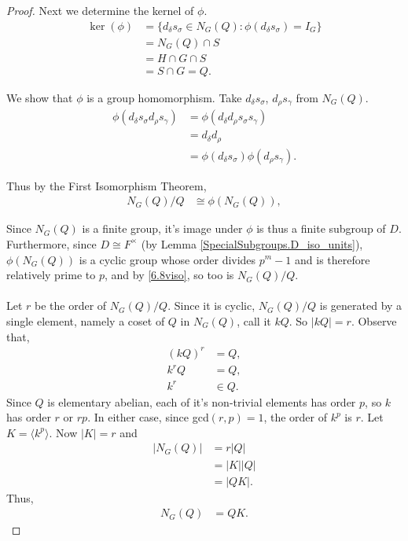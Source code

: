 \begin{footnotesize}
\begin{proof}
Next we determine the kernel of $\phi$.
\begin{align*} \ker(\phi) &= \{ d_\delta s_\sigma \in N_G(Q) : \phi(d_\delta s_\sigma) = I_G \}
\\ &= N_G(Q) \cap S
\\ &= H \cap G \cap S %
\\ &= S \cap G = Q. %
\end{align*}

We show that $\phi$ is a group homomorphism. Take $d_\delta s_\sigma$, $d_\rho s_\gamma$ from $ N_G(Q)$.
\begin{align*} \phi(d_\delta s_\sigma d_\rho s_\gamma) &= \phi(d_\delta d_\rho s_\sigma s_\gamma) %
\\ &= d_\delta d_\rho
\\ &= \phi(d_\delta s_\sigma) \phi(d_\rho s_\gamma).
\end{align*}

Thus by the First Isomorphism Theorem,
\begin{align}\label{6.8viso} N_G(Q) / Q &\cong \phi(N_G(Q)),
\end{align}

Since $N_G(Q)$ is a finite group, it's image under $\phi$ is thus a finite subgroup of $D$. Furthermore, since $D \cong F^\times$ (by Lemma \ref{SpecialSubgroups.D_iso_units}), $\phi(N_G(Q))$ is a cyclic group whose order divides $p^m-1$ and is therefore relatively prime to $p$, and by \eqref{6.8viso}, so too is $N_G(Q) / Q$. \\
\\
Let $r$ be the order of $N_G(Q) / Q$. Since it is cyclic, $N_G(Q)/Q$ is generated by a single element, namely a coset of $Q$ in $N_G(Q)$, call it $kQ$. So $|kQ| = r$. Observe that,
\begin{align*} (kQ)^r &= Q,
\\ k^rQ &= Q,
\\ k^r &\in Q.
\end{align*}
Since $Q$ is elementary abelian, each of it's non-trivial elements has order $p$, so $k$ has order $r$ or $rp$. In either case, since gcd$(r,p)=1$, the order of $k^p$ is $r$. Let $K = \langle k^p \rangle$. Now $|K| = r$ and
\begin{align*} |N_G(Q)| &= r|Q|
\\ &= |K||Q|
\\ &= |QK|. \tag{since $Q \cap K = I_G$} 
\end{align*}
Thus,
\begin{align}\label{QK} N_G(Q) &= QK.
\end{align}
\end{proof}





\end{footnotesize}
